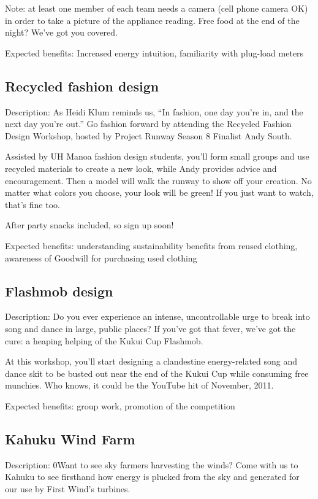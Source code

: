 Note: at least one member of each team needs a camera (cell phone camera OK) in order to take a picture of the appliance reading.  Free food at the end of the night? We've got you covered.

Expected benefits: Increased energy intuition, familiarity with plug-load meters


\subsection{Recycled fashion design}

Description: As Heidi Klum reminds us, ``In fashion, one day you're in, and the next day you're out.'' Go fashion forward by attending the Recycled Fashion Design Workshop, hosted by Project Runway Season 8 Finalist Andy South.

Assisted by UH Manoa fashion design students, you'll form small groups and use recycled materials to create a new look, while Andy provides advice and encouragement. Then a model will walk the runway to show off your creation. No matter what colors you choose, your look will be green! If you just want to watch, that's fine too.

After party snacks included, so sign up soon!

Expected benefits: understanding sustainability benefits from reused clothing, awareness of Goodwill for purchasing used clothing


\subsection{Flashmob design}

Description: Do you ever experience an intense, uncontrollable urge to break into song and dance in large, public places? If you've got that fever, we've got the cure: a heaping helping of the Kukui Cup Flashmob.

At this workshop, you'll start designing a clandestine energy-related song and dance skit to be busted out near the end of the Kukui Cup while consuming free munchies. Who knows, it could be the YouTube hit of November, 2011.

Expected benefits: group work, promotion of the competition


\subsection{Kahuku Wind Farm}

Description: 0Want to see sky farmers harvesting the winds? Come with us to Kahuku to see firsthand how energy is plucked from the sky and generated for our use by First Wind's turbines.

